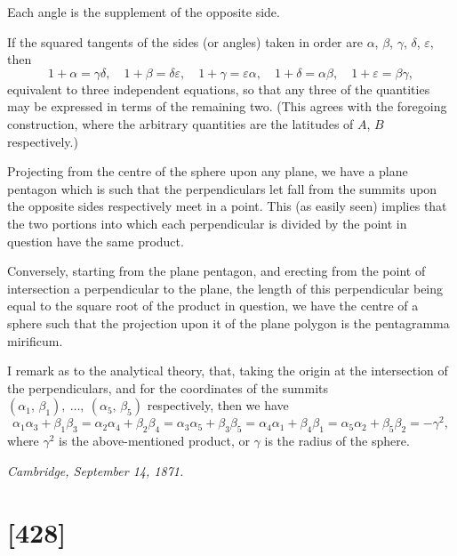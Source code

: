 \documentclass[11pt,a4paper]{article}
\theoremstyle{plain}
\theoremstyle{definition}
\begin{document}
Each angle is the supplement of the opposite side.

If the squared tangents of the sides (or angles) taken in order are $\alpha$, $\beta$, $\gamma$, $\delta$, $\varepsilon$, then
\[
1 + \alpha = \gamma\delta, \quad 1 + \beta = \delta\varepsilon, \quad 1 + \gamma = \varepsilon\alpha,
\quad 1 + \delta = \alpha\beta, \quad 1 + \varepsilon = \beta\gamma,
\]
equivalent to three independent equations, so that any three of the quantities may be
expressed in terms of the remaining two.  (This agrees with the foregoing construction,
where the arbitrary quantities are the latitudes of $A$, $B$ respectively.)

\clearpage

Projecting from the centre of the sphere upon any plane, we have a plane
pentagon which is such that the perpendiculars let fall from the summits upon the
opposite sides respectively meet in a point.  This (as easily seen) implies that the two
portions into which each perpendicular is divided by the point in question have the
same product.

Conversely, starting from the plane pentagon, and erecting from the point of intersection
a perpendicular to the plane, the length of this perpendicular being equal to
the square root of the product in question, we have the centre of a sphere such that
the projection upon it of the plane polygon is the pentagramma mirificum.

I remark as to the analytical theory, that, taking the origin at the intersection
of the perpendiculars, and for the coordinates of the summits $(\alpha_1,\,\beta_1),\ \dots,\ (\alpha_5,\,\beta_5)$ respectively,
then we have
\[
\alpha_1\alpha_3 + \beta_1\beta_3 = \alpha_2\alpha_4 + \beta_2\beta_4 = \alpha_3\alpha_5 + \beta_3\beta_5
= \alpha_4\alpha_1 + \beta_4\beta_1 = \alpha_5\alpha_2 + \beta_5\beta_2 = -\gamma^2,
\]
where $\gamma^2$ is the above-mentioned product, or $\gamma$ is the radius of the sphere.

\begin{flushright}
\textit{Cambridge, September 14, 1871.}
\end{flushright}

\clearpage

\section{[428]}
\end{document}
